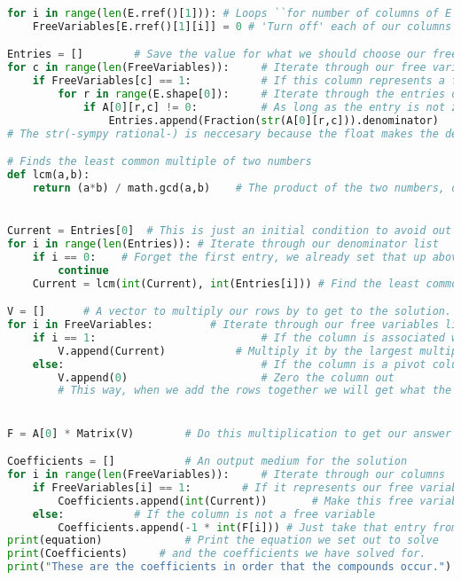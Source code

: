 \documentclass[10pt]{article}
\begin{document}
\begin{lstlisting}[language = Python]
for i in range(len(E.rref()[1])): # Loops ``for number of columns of E with pivots in them'' times
	FreeVariables[E.rref()[1][i]] = 0 # 'Turn off' each of our columns that is not associated with a free variable

Entries = [] 		# Save the value for what we should choose our free variables to be, so every output is a whole number
for c in range(len(FreeVariables)):		# Iterate through our free variables list
	if FreeVariables[c] == 1:			# If this column represents a free variable
		for r in range(E.shape[0]):		# Iterate through the entries of that column
			if A[0][r,c] != 0:			# As long as the entry is not zero
				Entries.append(Fraction(str(A[0][r,c])).denominator)  		# Then save the denominator of the fraction
# The str(-sympy rational-) is neccesary because the float makes the denominator innacurate -- it will evaluate 1/3 as 3333333/10000000  

# Finds the least common multiple of two numbers
def lcm(a,b):       
	return (a*b) / math.gcd(a,b)  	# The product of the two numbers, divided by the greatest common divisor of those two.


Current = Entries[0]  # This is just an initial condition to avoid out of range index errors **
for i in range(len(Entries)): # Iterate through our denominator list
	if i == 0:    # Forget the first entry, we already set that up above **
		continue  
	Current = lcm(int(Current), int(Entries[i])) # Find the least common multiple of the current least common multiple and the current entry in the list.

V = [] 		# A vector to multiply our rows by to get to the solution.
for i in FreeVariables:  		# Iterate through our free variables list
	if i == 1:     						# If the column is associated with a free variable
		V.append(Current) 			# Multiply it by the largest multiple
	else:         						# If the column is a pivot column
		V.append(0)   			 		# Zero the column out
		# This way, when we add the rows together we will get what the other variables equal.


F = A[0] * Matrix(V) 		# Do this multiplication to get our answer as F

Coefficients = []      		# An output medium for the solution     
for i in range(len(FreeVariables)):  	# Iterate through our columns
	if FreeVariables[i] == 1:    	 # If it represents our free variable
		Coefficients.append(int(Current))		# Make this free variable our chosen amount that makes all the numbers whole
	else: 			# If the column is not a free variable
		Coefficients.append(-1 * int(F[i])) # Just take that entry from our solution vector, and invert it.
print(equation)  			# Print the equation we set out to solve
print(Coefficients) 	# and the coefficients we have solved for.
print("These are the coefficients in order that the compounds occur.")  # Hopefully it works.
\end{lstlisting}
\end{document}
